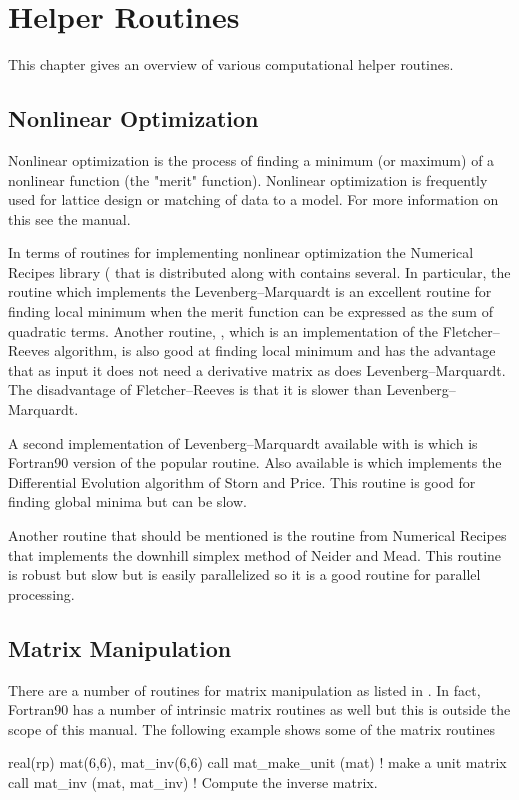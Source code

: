 \chapter{Helper Routines}
\label{c:helper}

This chapter gives an overview of various computational helper routines.

\section{Nonlinear Optimization}
\label{s:opti}

Nonlinear optimization is the process of finding a minimum (or
maximum) of a nonlinear function (the "merit" function). Nonlinear
optimization is frequently used for lattice design or matching of data
to a model. For more information on this see the \tao manual.

In terms of routines for implementing nonlinear optimization the
Numerical Recipes library ( that is distributed along
with \bmad contains several. In particular, the routine 
which implements the Levenberg--Marquardt is an excellent routine for
finding local minimum when the merit function can be expressed as the
sum of quadratic terms. Another routine, , which is an
implementation of the Fletcher--Reeves algorithm, is also good at
finding local minimum and has the advantage that as input it does not
need a derivative matrix as does Levenberg--Marquardt. The
disadvantage of Fletcher--Reeves is that it is slower than
Levenberg--Marquardt. 

A second implementation of Levenberg--Marquardt available with \bmad
is  which is Fortran90 version of the popular
 routine. Also available is  which implements
the Differential Evolution algorithm of Storn and
Price\cite{b:storn}. This routine is good for finding global minima
but can be slow. 

Another routine that should be mentioned is the  routine
from Numerical Recipes that implements the downhill simplex method of
Neider and Mead. This routine is robust but slow but is easily
parallelized so it is a good routine for parallel processing.

\section{Matrix Manipulation}
\label{s:matrix}

There are a number of \bmad routines for matrix manipulation as listed
in . In fact, Fortran90 has a number of intrinsic matrix
routines as well but this is outside the scope of this manual. The
following example shows some of the \bmad matrix routines
\begin{example}
  real(rp) mat(6,6), mat_inv(6,6)
  call mat_make_unit (mat)    ! make a unit matrix
  call mat_inv (mat, mat_inv) ! Compute the inverse matrix.
\end{example}